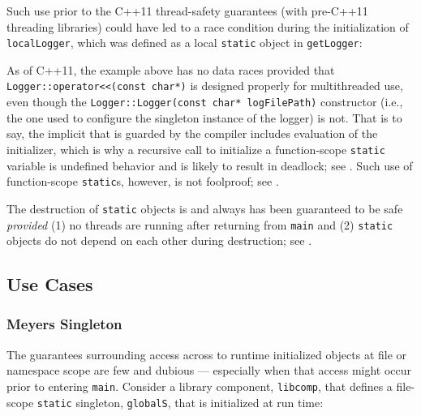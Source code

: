 Such use prior to the C++11 thread-safety guarantees (with pre-C++11 threading libraries) could
have led to a race condition during the initialization of
\lstinline!localLogger!, which was defined as a local \lstinline!static!
object in \lstinline!getLogger!:

\noindent As of C++11, the example above has no data races provided that \linebreak%
\lstinline!Logger::operator<<(const!~\lstinline!char*)! is designed properly
for multithreaded use, even though the
\lstinline!Logger::Logger(const!~\lstinline!char*!~\lstinline!logFilePath)!
constructor (i.e., the one used to configure the singleton instance of
the logger) is not. That is to say, the implicit 
that is guarded by the compiler includes evaluation of the
initializer, which is why a recursive call to initialize a
function-scope \lstinline!static! variable is undefined behavior and is
likely to result in deadlock; see .
Such use of function-scope \lstinline!static!s, however, is not foolproof;
see .

The destruction of  \lstinline!static! objects is
and always has been guaranteed to be safe \emph{provided} (1) no threads
are running after returning from \lstinline!main! and (2)
 \lstinline!static! objects do not depend on each
other during destruction; see .

\subsection[Use Cases]{Use Cases}\label{use-cases-functionstatic}

\subsubsection[Meyers Singleton]{Meyers Singleton}\label{meyers-singleton}

The guarantees surrounding access across  to runtime
initialized objects at file or namespace scope are few and dubious ---
especially when that access might occur prior to entering \lstinline!main!.
Consider a library component, \lstinline!libcomp!, that defines a
file-scope \lstinline!static! singleton, \lstinline!globalS!, that is
initialized at run time:

